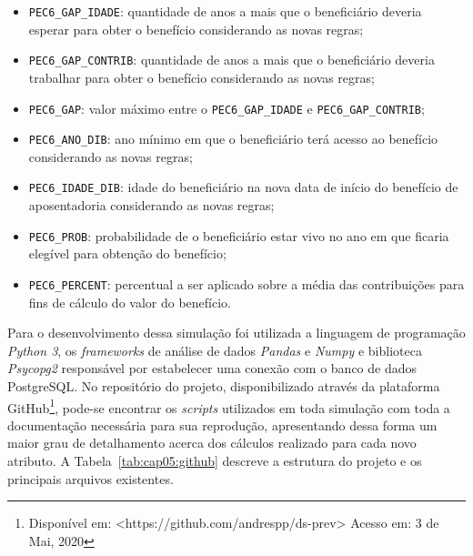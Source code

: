 \begin{itemize}
    \item \texttt{PEC6\_GAP\_IDADE}: quantidade de anos a mais que o beneficiário deveria esperar para obter o benefício considerando as novas regras;
    
    \item \texttt{PEC6\_GAP\_CONTRIB}: quantidade de anos a mais que o beneficiário deveria trabalhar para obter o benefício considerando as novas regras;
    
    \item \texttt{PEC6\_GAP}: valor máximo entre o \texttt{PEC6\_GAP\_IDADE} e \texttt{PEC6\_GAP\_CONTRIB};
    
    \item \texttt{PEC6\_ANO\_DIB}: ano mínimo em que o beneficiário terá acesso ao benefício considerando as novas regras;
    
    \item \texttt{PEC6\_IDADE\_DIB}: idade do beneficiário na nova data de início do benefício de aposentadoria considerando as novas regras;
    
    \item \texttt{PEC6\_PROB}: probabilidade de o beneficiário estar vivo no ano em que ficaria elegível para obtenção do benefício;
    
    \item \texttt{PEC6\_PERCENT}: percentual a ser aplicado sobre a média das contribuições para fins de cálculo do valor do benefício.
\end{itemize}

Para o desenvolvimento dessa simulação foi utilizada a linguagem de programação \textit{Python 3}, os \textit{frameworks} de análise de dados \textit{Pandas} e \textit{Numpy} e biblioteca \textit{Psycopg2} responsável por estabelecer uma conexão com o banco de dados PostgreSQL. No repositório do projeto, disponibilizado através da plataforma GitHub\footnote{Disponível em: <https://github.com/andrespp/ds-prev> Acesso em: 3 de Mai, 2020}, pode-se encontrar os \textit{scripts} utilizados em toda simulação com toda a documentação necessária para sua reprodução, apresentando dessa forma um maior grau de detalhamento acerca dos cálculos realizado para cada novo atributo. A Tabela~\ref{tab:cap05:github} descreve a estrutura do projeto e os principais arquivos existentes.

\newpage

